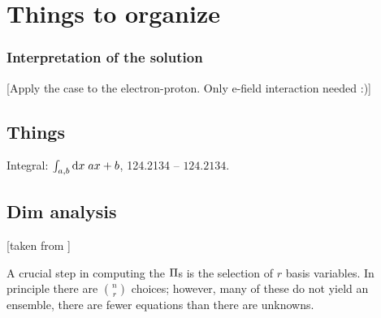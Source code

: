 \chapter{Things to organize}


\subsection{Interpretation of the solution}
%
[Apply the case to the electron-proton. Only e-field interaction needed :)]



\section{Things}
%
Integral: $\lint{a,b}{ax + b}{\dx x}$, 124.2134 -- $124.2134$.


\section{Dim analysis}
%
[taken from \cite[p. 97]{bhaskar:1990}]

A crucial step in computing the $\kdim$s is the selection of $r$ basis variables. In principle there are $\binom nr$ choices; however, many of these do not yield an ensemble, \ie there are fewer equations than there are unknowns.

